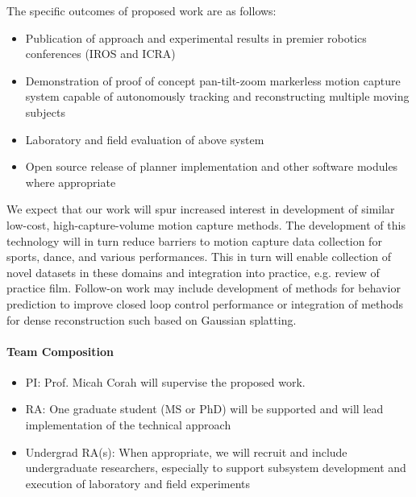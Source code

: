 \documentclass[12pt]{article}
\begin{document}
The specific outcomes of proposed work are as follows:
\begin{itemize}
  \item Publication of approach and experimental results in premier robotics
    conferences (IROS and ICRA)
  \item Demonstration of proof of concept pan-tilt-zoom markerless motion
    capture system capable of autonomously tracking and reconstructing multiple
    moving subjects
  \item Laboratory and field evaluation of above system
  \item Open source release of planner implementation and other software modules
    where appropriate
\end{itemize}
We expect that our work will spur increased interest in development of similar
low-cost, high-capture-volume motion capture methods.
The development of this technology will in turn reduce barriers to motion
capture data collection for sports, dance, and various performances.
This in turn will enable collection of novel datasets in these domains and
integration into practice, e.g. review of practice film.
Follow-on work may include development of methods for behavior prediction to
improve closed loop control performance or integration of methods for dense
reconstruction such based on Gaussian splatting.

\paragraph{Team Composition}

\begin{itemize}
  \item PI: Prof. Micah Corah will supervise the proposed work.
  \item RA: One graduate student (MS or PhD) will be supported and will lead
    implementation of the technical approach
  \item Undergrad RA(s): When appropriate, we will recruit and include
    undergraduate researchers, especially to support subsystem development and
    execution of laboratory and field experiments
\end{itemize}



\end{document}
